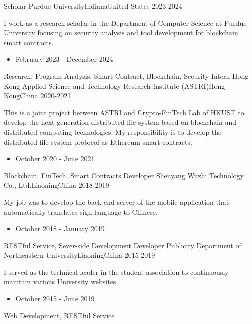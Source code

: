 \documentclass[localFont,alternative]{documentMETADATA}
\begin{document}

\begin{experiences}
	\experience
	{Scholar}   {Purdue University}{Indiana}{United States}
	{2023-2024} {
		I work as a research scholar in the Department of Computer Science at Purdue University focusing on security analysis and tool development for blockchain smart contracts.
		\begin{itemize}
			\item February 2023 - December 2024
		\end{itemize}
	}
	{Research, Program Analysis, Smart Contract, Blockchain, Security}
	\emptySeparator
	\experience
	{Intern}   {Hong Kong Applied Science and Technology Research Institute (ASTRI)}{Hong Kong}{China}
	{2020-2021} {
		This is a joint project between ASTRI and Crypto-FinTech Lab of HKUST to develop the next-generation distributed file system based on blockchain and distributed computing technologies.
		My responsibility is to develop the distributed file system protocol as Ethereum smart contracts.
		\begin{itemize}
			\item October 2020 - June 2021
		\end{itemize}
	}
	{Blockchain, FinTech, Smart Contracts}
	\emptySeparator
	\experience
	{Developer} {Shenyang Wuzhi Technology Co., Ltd.}{Liaoning}{China}
	{2018-2019}    {
		My job was to develop the back-end server of the mobile application that automatically translates sign language to Chinese.
		\begin{itemize}
			\item October 2018 - January 2019
		\end{itemize}
	}
	{RESTful Service, Sever-side Development}
	\emptySeparator
	\experience
	{Developer} {Publicity Department of Northeastern University}{Liaoning}{China}
	{2015-2019}    {
		I served as the technical leader in the student association to continuously maintain various University websites.
		\begin{itemize}
			\item October 2015 - June 2019
		\end{itemize}
	}
	{Web Development, RESTful Service}
\end{experiences}

\end{document}

